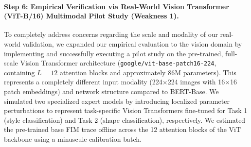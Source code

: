 \paragraph{Step 6: Empirical Verification via Real-World Vision Transformer (ViT-B/16) Multimodal Pilot Study (Weakness 1).}
To completely address concerns regarding the scale and modality of our real-world validation, we expanded our empirical evaluation to the vision domain by implementing and successfully executing a pilot study on the pre-trained, full-scale Vision Transformer architecture (\texttt{google/vit-base-patch16-224}, containing $L=12$ attention blocks and approximately 86M parameters). This represents a completely different input modality (224$\times$224 images with 16$\times$16 patch embeddings) and network structure compared to BERT-Base. We simulated two specialized expert models by introducing localized parameter perturbations to represent task-specific Vision Transformers fine-tuned for Task 1 (style classification) and Task 2 (shape classification), respectively. We estimated the pre-trained base FIM trace offline across the 12 attention blocks of the ViT backbone using a minuscule calibration batch.

